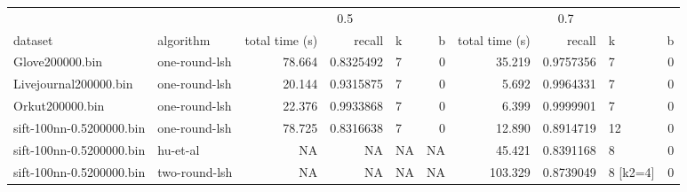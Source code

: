 \begin{table}[H]
\centering
\begin{tabular}[t]{llrrlrrrlr}
\toprule
\multicolumn{2}{c}{ } & \multicolumn{4}{c}{0.5} & \multicolumn{4}{c}{0.7} \\
\cmidrule(l{3pt}r{3pt}){3-6} \cmidrule(l{3pt}r{3pt}){7-10}
dataset & algorithm & total time (s) & recall & k & b & total time (s) & recall & k & b\\
\midrule
Glove200000.bin & one-round-lsh & 78.664 & 0.8325492 & 7 & 0 & 35.219 & 0.9757356 & 7 & 0\\
Livejournal200000.bin & one-round-lsh & 20.144 & 0.9315875 & 7 & 0 & 5.692 & 0.9964331 & 7 & 0\\
Orkut200000.bin & one-round-lsh & 22.376 & 0.9933868 & 7 & 0 & 6.399 & 0.9999901 & 7 & 0\\
sift-100nn-0.5200000.bin & one-round-lsh & 78.725 & 0.8316638 & 7 & 0 & 12.890 & 0.8914719 & 12 & 0\\
sift-100nn-0.5200000.bin & hu-et-al & NA & NA & NA & NA & 45.421 & 0.8391168 & 8 & 0\\
sift-100nn-0.5200000.bin & two-round-lsh & NA & NA & NA & NA & 103.329 & 0.8739049 & 8 [k2=4] & 0\\
\bottomrule
\end{tabular}
\end{table}